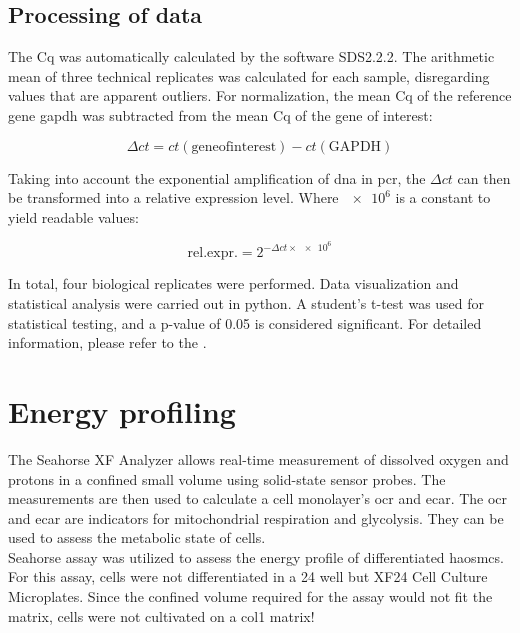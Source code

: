     \subsection{Processing of data}
    The \ac{Cq} was automatically calculated by the software SDS2.2.2. The arithmetic mean of three technical replicates was calculated for each sample, disregarding values that are apparent outliers. For normalization, the mean \ac{Cq} of the reference gene \ac{gapdh} was subtracted from the mean \ac{Cq} of the gene of interest:

    $$\Delta ct = ct(\mathrm{gene of interest}) - ct(\mathrm{GAPDH})$$

    Taking into account the exponential amplification of \ac{dna} in \ac{pcr}, the $\Delta ct$ can then be transformed into a relative expression level. Where $\num{e6}$ is a constant to yield readable values:

    $$\mathrm{rel. expr.} = 2^{-\Delta ct\times\num{e6}}$$

    In total, four biological replicates were performed. Data visualization and statistical analysis were carried out in python. A student's t-test was used for statistical testing, and a p-value of 0.05 is considered significant. For detailed information, please refer to the .

\section{Energy profiling}
\label{sec:seahorse}
The Seahorse XF Analyzer allows real-time measurement of dissolved oxygen and protons in a confined small volume using solid-state sensor probes. The measurements are then used to calculate a cell monolayer's \ac{ocr} and \ac{ecar}. The \ac{ocr} and \ac{ecar} are indicators for mitochondrial respiration and glycolysis. They can be used to assess the metabolic state of cells. \cite{agilenttechnologiesincHowAgilentSeahorse2022}\\
Seahorse assay was utilized to assess the energy profile of differentiated \acp{haosmc}. For this assay, cells were not differentiated in a \ac{24 well} but XF24 Cell Culture Microplates. Since the confined volume required for the assay would not fit the matrix, cells were not cultivated on a \ac{col1} matrix!

